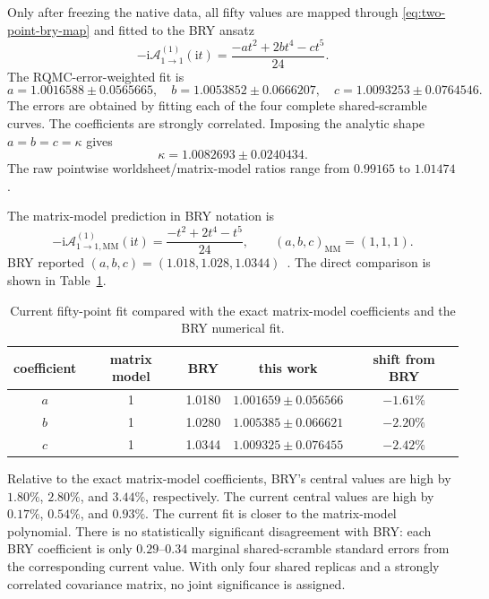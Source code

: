 \documentclass[11pt]{article}
\newcommand{\ii}{\mathrm{i}}
\newcommand{\A}{\mathcal{A}}
\begin{document}
Only after freezing the native data, all fifty values are mapped through
\eqref{eq:two-point-bry-map} and fitted to the BRY ansatz
\begin{equation}
 -\ii\A_{1\to1}^{(1)}(\ii t)
 =\frac{-a t^2+2b t^4-c t^5}{24}.
 \label{eq:two-point-fit-ansatz}
\end{equation}
The RQMC-error-weighted fit is
\begin{equation}
 \boxed{
 a=1.0016588\pm0.0565665,\quad
 b=1.0053852\pm0.0666207,\quad
 c=1.0093253\pm0.0764546.}
 \label{eq:two-point-fit}
\end{equation}
The errors are obtained by fitting each of the four complete shared-scramble
curves.  The coefficients are strongly correlated.  Imposing the analytic
shape $a=b=c=\kappa$ gives
\begin{equation}
 \boxed{\kappa=1.0082693\pm0.0240434.}
 \label{eq:two-point-kappa}
\end{equation}
The raw pointwise worldsheet/matrix-model ratios range from $0.99165$ to
$1.01474$.

The matrix-model prediction in BRY notation is
\begin{equation}
 -\ii\A_{1\to1,\mathrm{MM}}^{(1)}(\ii t)
 =\frac{-t^2+2t^4-t^5}{24},
 \qquad (a,b,c)_{\mathrm{MM}}=(1,1,1).
 \label{eq:two-point-matrix-model}
\end{equation}
BRY reported $(a,b,c)=(1.018,1.028,1.0344)$~\cite{BRY}.  The direct
comparison is shown in Table~\ref{tab:bry-comparison}.

\begin{table}[htbp]
\centering
\caption{Current fifty-point fit compared with the exact matrix-model
coefficients and the BRY numerical fit.}
\label{tab:bry-comparison}
\begin{tabular}{c c c c c}
\toprule
coefficient & matrix model & BRY & this work & shift from BRY\\
\midrule
$a$ & 1 & 1.0180 & $1.001659\pm0.056566$ & $-1.61\%$\\
$b$ & 1 & 1.0280 & $1.005385\pm0.066621$ & $-2.20\%$\\
$c$ & 1 & 1.0344 & $1.009325\pm0.076455$ & $-2.42\%$\\
\bottomrule
\end{tabular}
\end{table}

Relative to the exact matrix-model coefficients, BRY's central values are
high by $1.80\%$, $2.80\%$, and $3.44\%$, respectively.  The current central
values are high by $0.17\%$, $0.54\%$, and $0.93\%$.  The current fit is closer to
the matrix-model polynomial.  There is no statistically significant
disagreement with BRY: each BRY coefficient is only $0.29$--$0.34$ marginal
shared-scramble standard errors from the corresponding current value.  With
only four shared replicas and a strongly correlated covariance matrix, no
joint significance is assigned.
\end{document}
